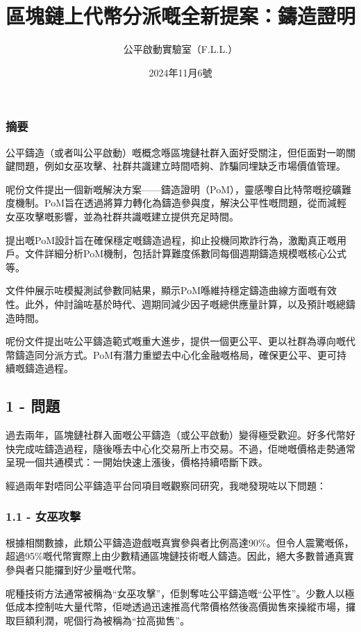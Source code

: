 \documentclass[
]{article}
\title{區塊鏈上代幣分派嘅全新提案：鑄造證明}
\author{公平啟動實驗室（F.L.L.）}
\date{2024年11月6號}
\begin{document}
\maketitle

\subsubsection{摘要}\label{ux6458ux8981}

公平鑄造（或者叫公平啟動）嘅概念喺區塊鏈社群入面好受關注，但佢面對一啲關鍵問題，例如女巫攻擊、社群共識建立時間唔夠、詐騙同埋缺乏市場價值管理。

呢份文件提出一個新嘅解決方案------鑄造證明（PoM），靈感嚟自比特幣嘅挖礦難度機制。PoM旨在透過將算力轉化為鑄造參與度，解決公平性嘅問題，從而減輕女巫攻擊嘅影響，並為社群共識嘅建立提供充足時間。

提出嘅PoM設計旨在確保穩定嘅鑄造過程，抑止投機同欺詐行為，激勵真正嘅用戶。文件詳細分析PoM機制，包括計算難度係數同每個週期鑄造規模嘅核心公式等。

文件仲展示咗模擬測試參數同結果，顯示PoM喺維持穩定鑄造曲線方面嘅有效性。此外，仲討論咗基於時代、週期同減少因子嘅總供應量計算，以及預計嘅總鑄造時間。

呢份文件提出咗公平鑄造範式嘅重大進步，提供一個更公平、更以社群為導向嘅代幣鑄造同分派方式。PoM有潛力重塑去中心化金融嘅格局，確保更公平、更可持續嘅鑄造過程。

\subsection{1 - 問題}\label{ux554fux984c}

過去兩年，區塊鏈社群入面嘅公平鑄造（或公平啟動）變得極受歡迎。好多代幣好快完成咗鑄造過程，隨後喺去中心化交易所上市交易。不過，佢哋嘅價格走勢通常呈現一個共通模式：一開始快速上漲後，價格持續唔斷下跌。

經過兩年對唔同公平鑄造平台同項目嘅觀察同研究，我哋發現咗以下問題：

\subsubsection{1.1 - 女巫攻擊}\label{ux5973ux5debux653bux64ca}

根據相關數據，此類公平鑄造遊戲嘅真實參與者比例高達90\%。但令人震驚嘅係，超過95\%嘅代幣實際上由少數精通區塊鏈技術嘅人鑄造。因此，絕大多數普通真實參與者只能攞到好少量嘅代幣。

呢種技術方法通常被稱為``女巫攻擊''，佢剝奪咗公平鑄造嘅``公平性''。少數人以極低成本控制咗大量代幣，佢哋透過迅速推高代幣價格然後高價拋售來操縱市場，攞取巨額利潤，呢個行為被稱為``拉高拋售''。
\end{document}
